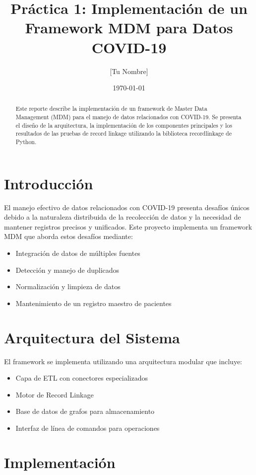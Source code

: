 \documentclass[12pt]{article}
\title{Práctica 1: Implementación de un Framework MDM para Datos COVID-19}
\author{[Tu Nombre]}
\date{\today}
\begin{document}
\maketitle

\begin{abstract}
Este reporte describe la implementación de un framework de Master Data Management (MDM) 
para el manejo de datos relacionados con COVID-19. Se presenta el diseño de la arquitectura, 
la implementación de los componentes principales y los resultados de las pruebas de 
record linkage utilizando la biblioteca recordlinkage de Python.
\end{abstract}

\section{Introducción}
El manejo efectivo de datos relacionados con COVID-19 presenta desafíos únicos debido 
a la naturaleza distribuida de la recolección de datos y la necesidad de mantener 
registros precisos y unificados. Este proyecto implementa un framework MDM que 
aborda estos desafíos mediante:

\begin{itemize}
    \item Integración de datos de múltiples fuentes
    \item Detección y manejo de duplicados
    \item Normalización y limpieza de datos
    \item Mantenimiento de un registro maestro de pacientes
\end{itemize}

\section{Arquitectura del Sistema}
El framework se implementa utilizando una arquitectura modular que incluye:

\begin{itemize}
    \item Capa de ETL con conectores especializados
    \item Motor de Record Linkage
    \item Base de datos de grafos para almacenamiento
    \item Interfaz de línea de comandos para operaciones
\end{itemize}

\section{Implementación}
\end{document}
